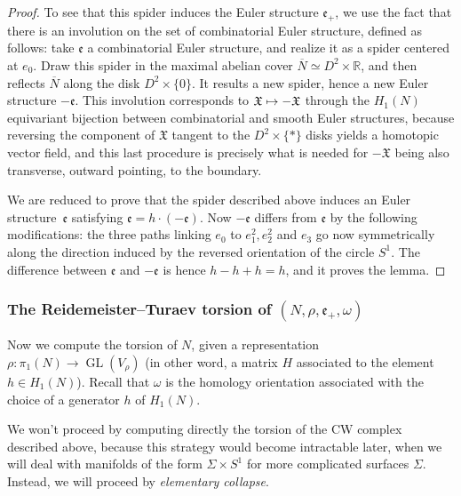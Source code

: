 \documentclass[JEP,XML,SOM,Unicode,NoFloatCountersInSection,published]{cedram}
\newcommand\mto{\mathchoice{\longmapsto}{\mapsto}{\mapsto}{\mapsto}}
\theoremstyle{plain}
\theoremstyle{definition}
\theoremstyle{remark}
\newcommand{\R}{\mathbb{R}}
\DeclareMathOperator{\GL}{GL}
\numberwithin{equation}{section}
\begin{document}
\begin{proof}
To see that this spider induces the Euler structure $\mathfrak e_+$, we use the fact that there is an involution on the set of combinatorial Euler structure, defined as follows:
take $\mathfrak e$ a combinatorial Euler structure, and realize it as a spider centered at $e_0$. Draw this spider in the maximal abelian cover $\overline N \simeq D^2 \times \R$, and then reflects $\overline N$ along the disk $D^2 \times \{ 0 \}$. It results a new spider, hence a new Euler structure $-\mathfrak e$. This involution corresponds to $\mathfrak X \mto -\mathfrak X$ through the $H_1(N)$ equivariant bijection between combinatorial and smooth Euler structures, because reversing the component of $\mathfrak X$ tangent to the $D^2 \times \{\ast \}$ disks yields a homotopic vector field, and this last procedure is precisely what is needed for $-\mathfrak X$ being also transverse, outward pointing, to the boundary.

We are reduced to prove that the spider described above induces an Euler structure~$\mathfrak e$ satisfying $\mathfrak e = h \cdot (-\mathfrak e)$. Now $-\mathfrak e$ differs from $\mathfrak e$ by the following modifications:
the three paths linking $e_0$ to $e_1^2, e_2^2$ and $e_3$ go now symmetrically along the direction induced by the reversed orientation of the circle $S^1$. The difference between $\mathfrak e$ and $-\mathfrak e$ is hence $h-h+h = h$, and it proves the lemma.
\end{proof}

\subsubsection*{The Reidemeister--Turaev torsion of $(N,\rho,\mathfrak e_+, \omega)$}
Now we compute the torsion of $N$, given a representation $\rho \colon \pi_1(N) \to \GL(V_\rho)$ (in other word, a matrix $H$ associated to the element $h \in H_1(N)$). Recall that $\omega$ is the homology orientation associated with the choice of a generator $h$ of $H_1(N)$.

We won't proceed by computing directly the torsion of the CW complex described above, because this strategy would become intractable later, when we will deal with manifolds of the form $\Sigma \times S^1$ for more complicated surfaces $\Sigma$. Instead, we will proceed by \emph{elementary collapse}.
\end{document}
